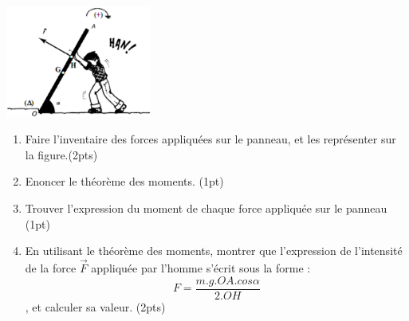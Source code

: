 \documentclass[12pt]{article}
\begin{document}
\begin{center}

    \includegraphics[width=0.36\textwidth]{./rotation.png}
\end{center}
\begin{enumerate}
    \item Faire l’inventaire des forces appliquées sur le panneau, et les
        représenter sur la figure.\dotfill(2pts)
    \item Enoncer le théorème des moments. \dotfill(1pt)
\item Trouver l’expression du moment de chaque force appliquée
    sur le panneau \dotfill(1pt)
\item En utilisant le théorème des moments, montrer que l’expression de l’intensité de la force $\vec{F}$ appliquée par l’homme s'écrit sous la forme :$$F = \frac{m.g.OA.cos\alpha}{2.OH}$$
    , et calculer sa valeur. \dotfill(2pts)
        \end{enumerate}
\end{document}
